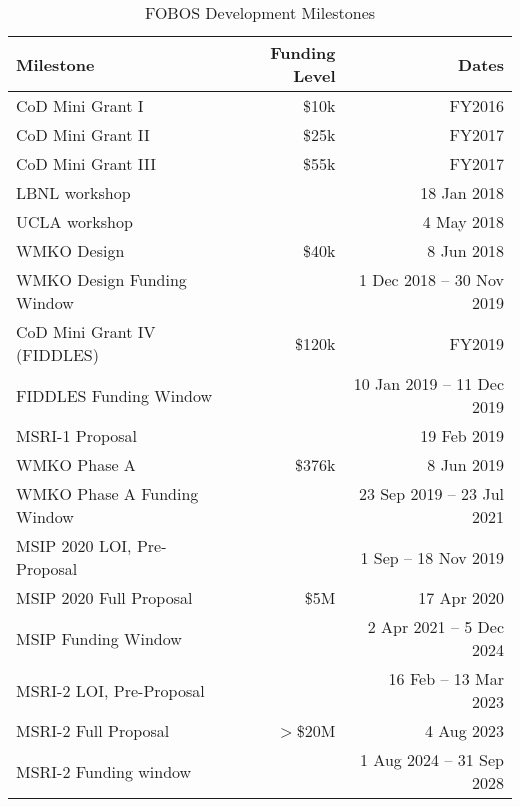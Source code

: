\begin{table}[h!]
\centering
\footnotesize
\caption{FOBOS Development Milestones}
\label{tab:milestones}
\vspace*{-10pt}
\begin{tabular}{l r r}
Milestone                     & Funding Level & Dates \\
\hline
\hline
CoD Mini Grant I              &  \$10k & FY2016 \\
CoD Mini Grant II             &  \$25k & FY2017 \\
CoD Mini Grant III            &  \$55k & FY2017 \\
LBNL workshop                 &        & 18 Jan 2018 \\
UCLA workshop                 &        & 4 May 2018 \\
WMKO Design                   &  \$40k & 8 Jun 2018 \\
WMKO Design Funding Window    &        & 1 Dec 2018 -- 30 Nov 2019 \\
CoD Mini Grant IV (FIDDLES)   & \$120k & FY2019 \\
FIDDLES Funding Window        &        & 10 Jan 2019 -- 11 Dec 2019 \\
\hline
MSRI-1 Proposal               &        & 19 Feb 2019 \\
WMKO Phase A                  & \$376k & 8 Jun 2019 \\
WMKO Phase A Funding Window   &        & 23 Sep 2019 -- 23 Jul 2021 \\
\hline
MSIP 2020 LOI, Pre-Proposal   &        & 1 Sep -- 18 Nov 2019 \\
MSIP 2020 Full Proposal       &   \$5M & 17 Apr 2020 \\
MSIP Funding Window           &        & 2 Apr 2021 -- 5 Dec 2024 \\
\hline
MSRI-2 LOI, Pre-Proposal      &        & 16 Feb -- 13 Mar 2023 \\
MSRI-2 Full Proposal          & $>$\$20M & 4 Aug 2023 \\
MSRI-2 Funding window         &        & 1 Aug 2024 -- 31 Sep 2028 \\
\hline
\end{tabular}
\end{table}

\newpage







